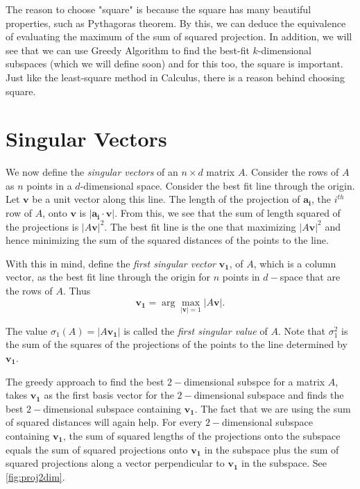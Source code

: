 The reason to choose "square" is because the square has many beautiful properties,
such as Pythagoras theorem. By this, we can deduce the equivalence of evaluating
the maximum of the sum of squared projection. In addition, we will see that we can
use Greedy Algorithm to find the best-fit \(k\)-dimensional subspaces (which we will define soon)
and for this too, the square is important. Just like the least-square method in Calculus,
there is a reason behind choosing square. 

\section{Singular Vectors}

We now define the \textit{singular vectors} of an \(n \times d\) matrix \(A\).
Consider the rows of \(A\) as \(n\) points in a \(d\)-dimensional space. 
Consider the best fit line through the origin. Let \(\mathbf{v} \) be a unit vector
along this line. The length of the projection of \(\mathbf{a_i}\), the \(i^{th}\) row of \(A\),
onto \(\mathbf{v} \) is \(\vert \mathbf{a_i} \cdot \mathbf{v} \vert \).
From this, we see that the sum of length squared of the projections is \(\vert A \mathbf{v}  \vert^2 \). The best fit line is the one that maximizing \(\vert A \mathbf{v}  \vert^2\)  and hence minimizing the sum of the squared distances of the points to the line.

With this in mind, define the \textit{first singular vector} \(\mathbf{v_1} \), of \(A\), which is a column vector, as the best fit line through the origin for \(n\) points in \(d-\)space that are the rows of \(A\). Thus
\[
  \mathbf{v_1} = \arg \max _{\vert \mathbf{v}  \vert = 1} \vert A \mathbf{v}  \vert.
\]

The value \(\sigma _1(A)=\vert A \mathbf{v_1}  \vert \) is called the \textit{first singular value} of \(A\). Note that \(\sigma _1^2\) is the sum of the squares of the projections of the points to the line determined by \(\mathbf{v_1} \). 

The greedy approach to find the best \(2-\)dimensional subspce for a matrix \(A\), takes \(\mathbf{v_1} \) as the first basis vector for the \(2-\)dimensional subspace and finds the best \(2-\)dimensional subspace containing \(\mathbf{v_1} \). The fact that we are using the sum of squared distances will again help. For every \(2-\)dimensional subspace containing \(\mathbf{v_1} \), the sum of squared lengths of the projections onto the subspace equals the sum of squared projections onto \(\mathbf{v_1} \) in the subspace plus the sum of squared projections along a vector perpendicular to \(\mathbf{v_1} \) in the subspace. See \autoref{fig:proj2dim}.

